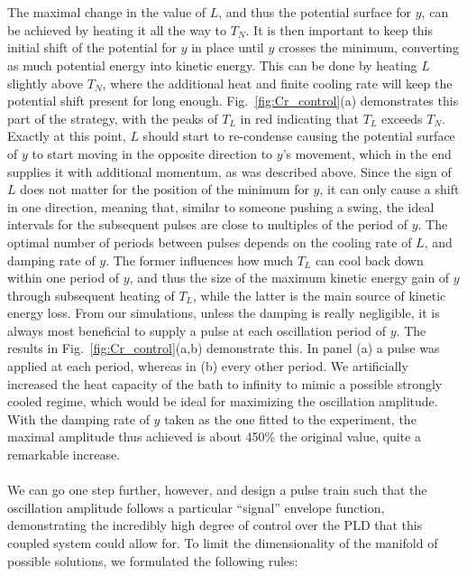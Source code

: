 \\\\
The maximal change in the value of $L$, and thus the potential surface for $y$, can be achieved by heating it all the way to $T_N$.
It is then important to keep this initial shift of the potential for $y$ in place until $y$ crosses the minimum, converting as much potential energy into kinetic energy.
This can be done by heating $L$ slightly above $T_N$, where the additional heat and finite cooling rate will keep the potential shift present for long enough.
Fig.~\ref{fig:Cr_control}(a) demonstrates this part of the strategy, with the peaks of $T_L$ in red indicating that $T_L$ exceeds $T_N$.
Exactly at this point, $L$ should start to re-condense causing the potential surface of $y$ to start moving in the opposite direction to $y$'s movement, which in the end supplies it with additional momentum, as was described above.
Since the sign of $L$ does not matter for the position of the minimum for $y$, it can only cause a shift in one direction, meaning that, similar to someone pushing a swing, the ideal intervals for the subsequent pulses are close to multiples of the period of $y$.
The optimal number of periods between pulses depends on the cooling rate of $L$, and damping rate of $y$.
The former influences how much $T_L$ can cool back down within one period of $y$, and thus the size of the maximum kinetic energy gain of $y$ through subsequent heating of $T_L$, while the latter is the main source of kinetic energy loss.
From our simulations, unless the damping is really negligible, it is always most beneficial to supply a pulse at each oscillation period of $y$.
The results in Fig.~\ref{fig:Cr_control}(a,b) demonstrate this. In panel (a) a pulse was applied at each  period, whereas in (b) every other period. 
We artificially increased the heat capacity of the bath to infinity to mimic a possible strongly cooled regime, which would be ideal for maximizing the oscillation amplitude.
With the damping rate of $y$ taken as the one fitted to the experiment, the maximal amplitude thus achieved is about 450\% the original value, quite a remarkable increase.  
\\\\
We can go one step further, however, and design a pulse train such that the oscillation amplitude follows a particular ``signal'' envelope function, demonstrating the incredibly high degree of control over the PLD that this coupled system could allow for.  
To limit the dimensionality of the manifold of possible solutions, we formulated the following rules:
